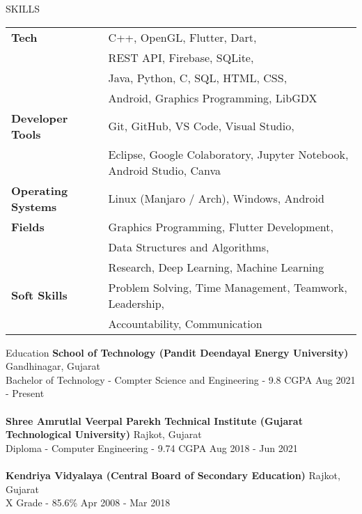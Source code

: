 \documentclass{resume} %
\begin{document}
\begin{rSection}{SKILLS}
\begin{tabular}{ @{} >{\bfseries}l @{\hspace{6ex}} l }
Tech 
& C++, OpenGL, Flutter, Dart, \\
& REST API, Firebase, SQLite, \\ 
& Java, Python, C, SQL, HTML, CSS, \\
& Android, Graphics Programming, LibGDX \\

Developer Tools 
& Git, GitHub, VS Code, Visual Studio, \\ 
& Eclipse, Google Colaboratory, Jupyter Notebook, Android Studio, Canva \\

Operating Systems 
& Linux (Manjaro / Arch), Windows, Android \\

Fields 
& Graphics Programming, Flutter Development,\\
& Data Structures and Algorithms, \\ & Research, Deep Learning, Machine Learning\\
Soft Skills 
& Problem Solving, Time Management, Teamwork, Leadership,\\
& Accountability, Communication
\\
\end{tabular}
\end{rSection}

\begin{rSection}{Education}
{\bf School of Technology (Pandit Deendayal Energy University)} \hfill {Gandhinagar, Gujarat}\\
Bachelor of Technology - Compter Science and Engineering - 9.8 CGPA \hfill {Aug 2021 - Present}\\
\\
{\bf Shree Amrutlal Veerpal Parekh Technical Institute (Gujarat Technological University)} \hfill {Rajkot, Gujarat}\\
Diploma - Computer Engineering - 9.74 CGPA \hfill {Aug 2018 - Jun 2021}\\
\\
{\bf Kendriya Vidyalaya (Central Board of Secondary Education)} \hfill {Rajkot, Gujarat}\\
X Grade - 85.6\% \hfill {Apr 2008 - Mar 2018}
\end{rSection}
\end{document}
